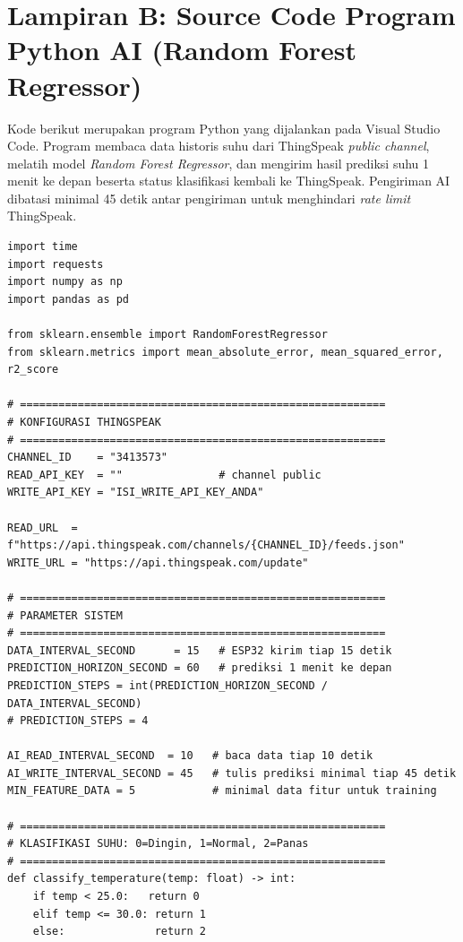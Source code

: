 \section*{Lampiran B: Source Code Program Python AI (Random Forest Regressor)}
{}

Kode berikut merupakan program Python yang dijalankan pada Visual Studio Code.
Program membaca data historis suhu dari ThingSpeak \textit{public channel},
melatih model \textit{Random Forest Regressor}, dan mengirim hasil prediksi
suhu 1 menit ke depan beserta status klasifikasi kembali ke ThingSpeak.
Pengiriman AI dibatasi minimal 45 detik antar pengiriman untuk menghindari
\textit{rate limit} ThingSpeak.

\begin{lstlisting}[style=pythonstyle,
    caption={Program Python AI Random Forest Regressor untuk Prediksi Suhu 1 Menit},
    label={lst:python}]
import time
import requests
import numpy as np
import pandas as pd

from sklearn.ensemble import RandomForestRegressor
from sklearn.metrics import mean_absolute_error, mean_squared_error, r2_score

# =========================================================
# KONFIGURASI THINGSPEAK
# =========================================================
CHANNEL_ID    = "3413573"
READ_API_KEY  = ""               # channel public
WRITE_API_KEY = "ISI_WRITE_API_KEY_ANDA"

READ_URL  = f"https://api.thingspeak.com/channels/{CHANNEL_ID}/feeds.json"
WRITE_URL = "https://api.thingspeak.com/update"

# =========================================================
# PARAMETER SISTEM
# =========================================================
DATA_INTERVAL_SECOND      = 15   # ESP32 kirim tiap 15 detik
PREDICTION_HORIZON_SECOND = 60   # prediksi 1 menit ke depan
PREDICTION_STEPS = int(PREDICTION_HORIZON_SECOND / DATA_INTERVAL_SECOND)
# PREDICTION_STEPS = 4

AI_READ_INTERVAL_SECOND  = 10   # baca data tiap 10 detik
AI_WRITE_INTERVAL_SECOND = 45   # tulis prediksi minimal tiap 45 detik
MIN_FEATURE_DATA = 5            # minimal data fitur untuk training

# =========================================================
# KLASIFIKASI SUHU: 0=Dingin, 1=Normal, 2=Panas
# =========================================================
def classify_temperature(temp: float) -> int:
    if temp < 25.0:   return 0
    elif temp <= 30.0: return 1
    else:              return 2


\end{lstlisting}
